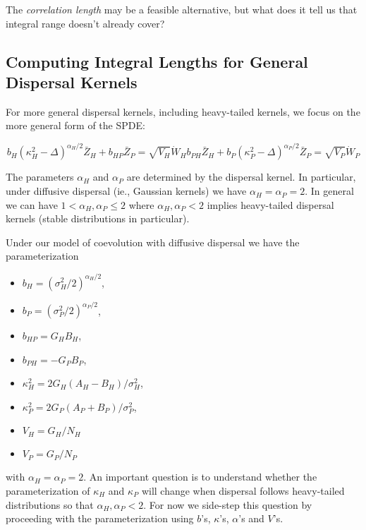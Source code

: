 \documentclass{article}
\begin{document}
The \emph{correlation length} may be a feasible alternative, but what
does it tell us that integral range doesn't already cover?

\hypertarget{computing-integral-lengths-for-general-dispersal-kernels}{%
\subsection{Computing Integral Lengths for General Dispersal
Kernels}\label{computing-integral-lengths-for-general-dispersal-kernels}}

For more general dispersal kernels, including heavy-tailed kernels, we
focus on the more general form of the SPDE:

\begin{subequations}
  \begin{equation}
    b_H(\kappa_H^2-\Delta)^{\alpha_H/2}\bar Z_H + b_{HP}\bar Z_P = \sqrt{V_H}\dot W_H
  \end{equation}
  \begin{equation}
    b_{PH}\bar Z_H + b_P(\kappa_P^2-\Delta)^{\alpha_P/2}\bar Z_P = \sqrt{V_P}\dot W_P
  \end{equation}
\end{subequations}

The parameters \(\alpha_H\) and \(\alpha_P\) are determined by the
dispersal kernel. In particular, under diffusive dispersal (ie.,
Gaussian kernels) we have \(\alpha_H=\alpha_P=2\). In general we can
have \(1<\alpha_H,\alpha_P\leq2\) where \(\alpha_H,\alpha_P<2\) implies
heavy-tailed dispersal kernels (stable distributions in particular).

Under our model of coevolution with diffusive dispersal we have the
parameterization

\begin{itemize}
\tightlist
\item
  \(b_H=(\sigma^2_H/2)^{\alpha_H/2}\),
\item
  \(b_P=(\sigma^2_P/2)^{\alpha_P/2}\),
\item
  \(b_{HP}=G_HB_H\),
\item
  \(b_{PH}=-G_PB_P\),
\item
  \(\kappa_H^2=2G_H(A_H-B_H)/\sigma^2_H\),
\item
  \(\kappa_P^2=2G_P(A_P+B_P)/\sigma^2_P\),
\item
  \(V_H=G_H/N_H\)
\item
  \(V_P=G_P/N_P\)
\end{itemize}

with \(\alpha_H=\alpha_P=2\). An important question is to understand
whether the parameterization of \(\kappa_H\) and \(\kappa_P\) will
change when dispersal follows heavy-tailed distributions so that
\(\alpha_H,\alpha_P<2\). For now we side-step this question by
proceeding with the parameterization using \(b\)'s, \(\kappa\)'s,
\(\alpha\)'s and \(V\)'s.
\end{document}
